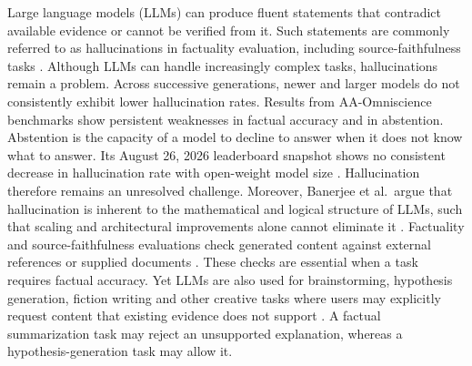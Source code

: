 \documentclass{clv2025}
\begin{document}
Large language models (LLMs) can produce fluent statements that contradict
available evidence or cannot be verified from it. 
Such statements are commonly referred to as hallucinations in factuality evaluation, including source-faithfulness tasks \citep{ji_survey_2023,huang_survey_2025}.
Although LLMs can handle increasingly complex tasks, hallucinations remain a problem.
Across successive generations, newer and larger models do not
consistently exhibit lower hallucination rates. 
Results from AA-Omniscience benchmarks show
persistent weaknesses in factual accuracy and in abstention. Abstention is
the capacity of a model to decline to answer when it does not know what to answer.
Its August 26,
2026 leaderboard snapshot shows no consistent decrease in hallucination rate
with open-weight model size
\citep{jackson_aaomniscience_2025,artificialanalysis_omniscience_leaderboard_2026}.
Hallucination therefore remains an unresolved challenge. Moreover, Banerjee
et al.\ argue that hallucination is inherent to the mathematical and logical
structure of LLMs, such that scaling and architectural improvements alone
cannot eliminate it \citep{banerjee_llms_2024}.
Factuality and source-faithfulness evaluations check generated content against external references or supplied documents \citep{maynez_faithfulness_2020,kryscinski_evaluating_2020,min_factscore_2023}.
These checks are essential when a task requires factual accuracy.
Yet LLMs are also used for brainstorming, hypothesis generation,  fiction writing and other creative tasks
where users may explicitly request content that existing evidence does not
support \citep{franceschelli_creativity_2024,jiang_survey_2024}.
A factual summarization task may reject an unsupported explanation, whereas a hypothesis-generation task may allow it.
\end{document}
